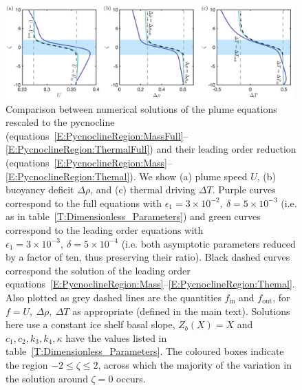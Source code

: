 \documentclass[openacc]{rsproca_new}%
\newcommand{\epsone}{\epsilon_{1}} %
\newcommand{\lt}{\delta} %
\renewcommand{\in}{\text{in}} %
\newcommand{\out}{\text{out}}
\begin{document}
\begin{figure}
\centering
\includegraphics[width = 0.99\textwidth]{Submitted_PRSA/make_plots/plots/figure4.pdf}
\caption{Comparison between numerical solutions of the plume equations rescaled to the pycnocline (equations~\eqref{E:PycnoclineRegion:MassFull}--\eqref{E:PycnoclineRegion:ThermalFull}) and their leading order reduction (equations~\eqref{E:PycnoclineRegion:Mass}--\eqref{E:PycnoclineRegion:Themal}). We show (a) plume speed $U$, (b) buoyancy deficit $\Delta \rho$, and (c) thermal driving $\Delta T$. Purple curves correspond to the full equations with $\epsone = 3\times10^{-2}, ~\lt = 5\times10^{-3}$ (i.e. as in table~\ref{T:Dimensionless_Parameters}) and green curves correspond to the leading order equations with $\epsone = 3\times10^{-3},~ \lt = 5\times10^{-4}$ (i.e. both asymptotic parameters reduced by a factor of ten, thus preserving their ratio). Black dashed curves correspond the solution of the leading order equations~\eqref{E:PycnoclineRegion:Mass}--\eqref{E:PycnoclineRegion:Themal}. Also plotted as grey dashed lines are the quantities $f_{\in}$ and $f_{\out}$, for $f = U,~ \Delta \rho, ~\Delta T$ as appropriate (defined in the main text). Solutions here use a constant ice shelf basal slope, $Z_b(X) = X$ and $c_1, c_2, k_3,k_4, \kappa$ have the values listed in table~\ref{T:Dimensionless_Parameters}. The coloured boxes indicate the region $-2 \leq \zeta \leq 2$, across which the majority of the variation in the solution around $\zeta = 0 $ occurs.}\label{fig:PycnoclineAsymptotics}
\end{figure}
\end{document}
